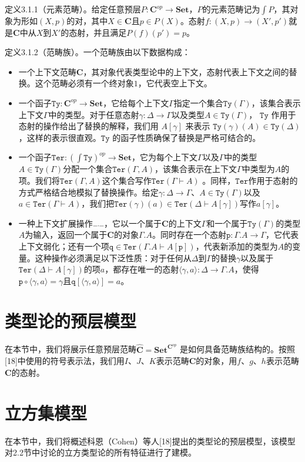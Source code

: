 \documentclass{ctexrep}
\theoremstyle{plain}
\theoremstyle{definition}
\theoremstyle{remark}
\newcommand\Ty{\mathtt{Ty}}
\newcommand\Ter{\mathtt{Ter}}
\newcommand\Set{\mathbf{Set}}
\newcommand\C{\mathbf{C}}
\newcommand{\qq}{\mathtt{q}}
\newcommand{\pp}{\mathtt{p}}
\newcommand{\ul}{{\rule[0ex]{0.5em}{0.4pt}}} %
\begin{document}
定义3.1.1（元素范畴）。给定任意预层\(P: \C^{op} \to \Set\)，\(P\)的元素范畴记为\(\int P\)，其对象为形如\((X, p)\)的对，其中\(X \in \C\)且\(p \in P(X)\)。态射\(f: (X, p) \to (X', p')\)就是\(\C\)中从\(X\)到\(X'\)的态射，并且满足\(P(f)(p') = p\)。 

定义3.1.2（范畴族）。一个范畴族由以下数据构成：
\begin{itemize}
  \item 一个上下文范畴$\C$，其对象代表类型论中的上下文，态射代表上下文之间的替换。这个范畴必须有一个终对象$1$，它代表空上下文。 
  \item 一个函子$\Ty:\C^{op}\to \Set$，它给每个上下文$\Gamma$指定一个集合$\Ty(\Gamma)$，该集合表示上下文$\Gamma$中的类型。对于任意态射$\gamma:\Delta\to\Gamma$以及类型$A\in \Ty(\Gamma)$， $\Ty$ 作用于态射的操作给出了替换的解释，我们用 $A[\gamma]$ 来表示 $\Ty(\gamma)(A) \in \Ty(\Delta)$，这样的表示很直观。$\Ty$ 的函子性质确保了替换是严格可结合的。
  \item 一个函子$\Ter: (\int \Ty)^{op} \to \Set$，它为每个上下文$\Gamma$以及$\Gamma$中的类型$A \in \Ty(\Gamma)$分配一个集合$\Ter(\Gamma, A)$，该集合表示在上下文$\Gamma$中类型为$A$的项。我们将$\Ter(\Gamma, A)$这个集合写作$\Ter(\Gamma \vdash A)$ 。同样，$\Ter$作用于态射的方式严格结合地模拟了替换操作。给定$\gamma: \Delta \to \Gamma$、$A \in \Ty(\Gamma)$以及$a \in \Ter(\Gamma \vdash A)$，我们把$\Ter(\gamma)(a) \in \Ter(\Delta \vdash A[\gamma])$写作$a[\gamma]$。
  \item 一种上下文扩展操作$\ul .\ul $，它以一个属于$\C$的上下文$\Gamma$和一个属于$\Ty(\Gamma)$的类型$A$为输入，返回一个属于$\C$的对象$\Gamma.A$。同时存在一个态射$\pp: \Gamma.A \to \Gamma$，它代表上下文弱化；还有一个项$\qq \in \Ter(\Gamma . A \vdash A[\pp])$，代表新添加的类型为$A$的变量。这种操作必须满足以下泛性质：对于任何从$\Delta$到$\Gamma$的替换$\gamma$以及属于$\Ter(\Delta \vdash A[\gamma])$的项$a$，都存在唯一的态射$\langle\gamma, a\rangle: \Delta \to \Gamma . A$，使得$\pp \circ\langle\gamma, a\rangle=\gamma$且$\qq[\langle\gamma, a\rangle]=a$。 
\end{itemize}

\section{类型论的预层模型}
在本节中，我们将展示任意预层范畴\(\widehat{\C} = \Set^{\C^{op}}\) 是如何具备范畴族结构的。按照[18]中使用的符号表示法，我们用\(I\)、\(J\)、\(K\)表示范畴\(\C\)的对象，用\(f\)、\(g\)、\(h\)表示范畴\(\C\)的态射。

\section{立方集模型}
在本节中，我们将概述科恩（Cohen）等人[18]提出的类型论的预层模型，该模型对2.2节中讨论的立方类型论的所有特征进行了建模。 
\end{document}
